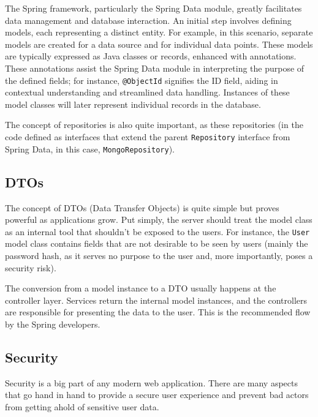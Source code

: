\documentclass[FM,BP,EN,fonts]{tulthesis}
\begin{document}
The Spring framework, particularly the Spring Data module, greatly facilitates data management and database interaction. An initial step involves defining models, each representing a distinct entity. For example, in this scenario, separate models are created for a data source and for individual data points. These models are typically expressed as Java classes or records, enhanced with annotations. These annotations assist the Spring Data module in interpreting the purpose of the defined fields; for instance, \verb|@ObjectId| signifies the ID field, aiding in contextual understanding and streamlined data handling. Instances of these model classes will later represent individual records in the database.

The concept of repositories is also quite important, as these repositories (in the code defined as interfaces that extend the parent \verb|Repository| interface from Spring Data, in this case, \verb|MongoRepository|).

\subsection{DTOs}
The concept of DTOs (Data Transfer Objects) is quite simple but proves powerful as applications grow. Put simply, the server should treat the model class as an internal tool that shouldn't be exposed to the users. For instance, the \verb|User| model class contains fields that are not desirable to be seen by users (mainly the password hash, as it serves no purpose to the user and, more importantly, poses a security risk).

The conversion from a model instance to a DTO usually happens at the controller layer. Services return the internal model instances, and the controllers are responsible for presenting the data to the user. This is the recommended flow by the Spring developers.

\subsection{Security}
Security is a big part of any modern web application. There are many aspects that go hand in hand to provide a secure user experience and prevent bad actors from getting ahold of sensitive user data. 
\end{document}
